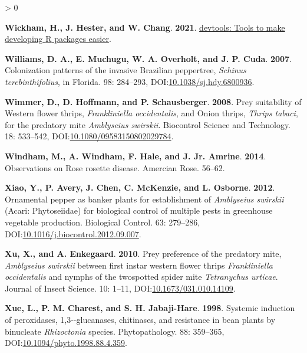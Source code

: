 \documentclass{ufdissertation}[overrideChapters] %
\newlength{\cslhangindent}
\newenvironment{CSLReferences}[2] %
 {%
  \setlength{\parindent}{0pt}
  \ifodd #1 \everypar{\setlength{\hangindent}{\cslhangindent}}\ignorespaces\fi
  \ifnum #2 > 0
  \setlength{\parskip}{#2\baselineskip}
  \fi
 }%
 {}
\begin{document}
{\begin{CSLReferences}{1}{1}
\leavevmode{}%
\textbf{Wickham, H., J. Hester, and W. Chang}. \textbf{2021}. \href{https://CRAN.R-project.org/package=devtools}{{devtools}: Tools to make developing {R} packages easier}.

\leavevmode{}%
\textbf{Williams, D. A., E. Muchugu, W. A. Overholt, and J. P. Cuda}. \textbf{2007}. Colonization patterns of the invasive {Brazilian} peppertree, {\emph{Schinus terebinthifolius}}, in {Florida}. 98: 284--293, DOI:\href{https://doi.org/10.1038/sj.hdy.6800936}{10.1038/sj.hdy.6800936}.

\leavevmode{}%
\textbf{Wimmer, D., D. Hoffmann, and P. Schausberger}. \textbf{2008}. Prey suitability of {Western flower thrips}, {\emph{Frankliniella occidentalis}}, and {Onion thrips}, {\emph{Thrips tabaci}}, for the predatory mite {\emph{Amblyseius swirskii}}. Biocontrol Science and Technology. 18: 533--542, DOI:\href{https://doi.org/10.1080/09583150802029784}{10.1080/09583150802029784}.

\leavevmode{}%
\textbf{Windham, M., A. Windham, F. Hale, and J. Jr. Amrine}. \textbf{2014}. Observations on {Rose rosette disease}. Amercian Rose. 56--62.

\leavevmode{}%
\textbf{Xiao, Y., P. Avery, J. Chen, C. McKenzie, and L. Osborne}. \textbf{2012}. Ornamental pepper as banker plants for establishment of {\emph{Amblyseius swirskii}} ({Acari}: {Phytoseiidae}) for biological control of multiple pests in greenhouse vegetable production. Biological Control. 63: 279--286, DOI:\href{https://doi.org/10.1016/j.biocontrol.2012.09.007}{10.1016/j.biocontrol.2012.09.007}.

\leavevmode{}%
\textbf{Xu, X., and A. Enkegaard}. \textbf{2010}. Prey preference of the predatory mite, {\emph{Amblyseius swirskii}} between first instar western flower thrips {\emph{Frankliniella occidentalis}} and nymphs of the twospotted spider mite {\emph{Tetranychus urticae}}. Journal of Insect Science. 10: 1--11, DOI:\href{https://doi.org/10.1673/031.010.14109}{10.1673/031.010.14109}.

\leavevmode{}%
\textbf{Xue, L., P. M. Charest, and S. H. Jabaji-Hare}. \textbf{1998}. Systemic induction of peroxidases, 1,3-\textbeta-glucanases, chitinases, and resistance in bean plants by binucleate {\emph{Rhizoctonia}} species. Phytopathology{\textregistered}. 88: 359--365, DOI:\href{https://doi.org/10.1094/phyto.1998.88.4.359}{10.1094/phyto.1998.88.4.359}.


\end{CSLReferences}}
\end{document}
